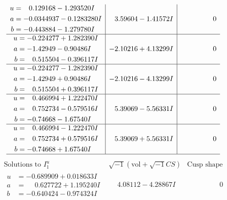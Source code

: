 \documentclass[1p]{elsarticle_modified}
\theoremstyle{definition}
\newcommand{\I}{\sqrt{-1}}
\begin{document}
$$\begin{array}{c|c|c}
\begin{aligned}
u &= \phantom{-}0.129168 - 1.293520 I \\
a &= -0.0344937 - 0.1283280 I \\
b &= -0.443884 - 1.279780 I\end{aligned}
 & \phantom{-}3.59604 - 1.41572 I & \phantom{-0.000000 } 0 \\ \hline\begin{aligned}
u &= -0.224277 + 1.282390 I \\
a &= -1.42949 - 0.90486 I \\
b &= \phantom{-}0.515504 - 0.396117 I\end{aligned}
 & -2.10216 + 4.13299 I & \phantom{-0.000000 } 0 \\ \hline\begin{aligned}
u &= -0.224277 - 1.282390 I \\
a &= -1.42949 + 0.90486 I \\
b &= \phantom{-}0.515504 + 0.396117 I\end{aligned}
 & -2.10216 - 4.13299 I & \phantom{-0.000000 } 0 \\ \hline\begin{aligned}
u &= \phantom{-}0.466994 + 1.222470 I \\
a &= \phantom{-}0.752734 - 0.579516 I \\
b &= -0.74668 - 1.67540 I\end{aligned}
 & \phantom{-}5.39069 - 5.56331 I & \phantom{-0.000000 } 0 \\ \hline\begin{aligned}
u &= \phantom{-}0.466994 - 1.222470 I \\
a &= \phantom{-}0.752734 + 0.579516 I \\
b &= -0.74668 + 1.67540 I\end{aligned}
 & \phantom{-}5.39069 + 5.56331 I & \phantom{-0.000000 } 0\\
 \hline 
 \end{array}$$\newpage$$\begin{array}{c|c|c}  
\text{Solutions to }I^u_{1}& \I (\text{vol} + \sqrt{-1}CS) & \text{Cusp shape}\\
 \hline 
\begin{aligned}
u &= -0.689909 + 0.018633 I \\
a &= \phantom{-}0.627722 + 1.195240 I \\
b &= -0.640424 - 0.974324 I\end{aligned}
 & \phantom{-}4.08112 - 4.28867 I & \phantom{-0.000000 } 0 \\ \hline\begin{aligned}

\end{aligned}
\end{array}$$
\end{document}
